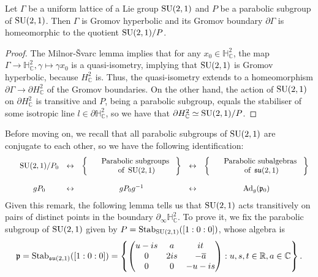 \documentclass{report}
\begin{document}
\begin{lemma}\label{lem:lattice_boundary}
    Let $\Gamma$ be a uniform lattice of a Lie group $\operatorname{{\mathrm{SU}}}(2,1)$ and $P$ be a parabolic subgroup of $\operatorname{{\mathrm{SU}}}(2,1)$.
    Then $\Gamma$ is Gromov hyperbolic and its Gromov boundary $\partial \Gamma$ is homeomorphic to the quotient $\operatorname{{\mathrm{SU}}}(2,1)/P$.  
\end{lemma}
\begin{proof}
    The Milnor-Švarc lemma implies that for any $x_0 \in \mathbb H^2_{\mathbb C}$, the map $\Gamma \to \mathbb H^2_{\mathbb C}, \gamma \mapsto \gamma x_0$ is a quasi-isometry, implying that $\operatorname{{\mathrm{SU}}}(2,1)$ is Gromov hyperbolic, because $H^2_{\mathbb C}$ is.
    Thus, the quasi-isometry extends to a homeomorphism $\partial \Gamma \to \partial H^2_{\mathbb C}$ of the Gromov boundaries.
    On the other hand, the action of $\operatorname{{\mathrm{SU}}}(2,1)$ on $\partial H^2_\mathbb C$ is transitive and $P$, being a parabolic subgroup, equals the stabiliser of some isotropic line $l \in \partial \mathbb H^2_{\mathbb C}$, so we have that $\partial H^2_{\mathbb C} \simeq \operatorname{{\mathrm{SU}}}(2,1)/P$.
\end{proof}
Before moving on, we recall that all parabolic subgroups of $\operatorname{{\mathrm{SU}}}(2,1)$ are conjugate to each other, so we have the following identification:
\[
\begin{array}{cccccc}
    &\operatorname{{\mathrm{SU}}}(2,1)/{P_0} &\leftrightarrow &    \left\{ \begin{array}{cc}
        &\text{ Parabolic subgroups }\\
        &\text{ of } \operatorname{{\mathrm{SU}}}(2,1)
    \end{array} \right\}
 &\leftrightarrow &    \left\{ \begin{array}{cc}
    &\text{ Parabolic subalgebras }\\
    &\text{ of } \operatorname{{\mathfrak{su}}}(2,1)
\end{array} \right\}
\\~\\
    &g P_0 &\leftrightarrow &g P_0 g^{-1} &\leftrightarrow &\operatorname{Ad}_g(\mathfrak p_0)
\end{array}
\]
Given this remark, the following lemma tells us that $\operatorname{{\mathrm{SU}}}(2,1)$ acts transitively on pairs of distinct points in the boundary $\partial_\infty \mathbb H^2_{\mathbb C}$.
To prove it, we fix the parabolic subgroup of $\operatorname{{\mathrm{SU}}}(2,1)$ given by $P = \operatorname{Stab}_{\operatorname{{\mathrm{SU}}}(2,1)}([1:0:0])$,
whose algebra is
\[
\mathfrak p = \operatorname{Stab}_{\operatorname{{\mathfrak{su}}}(2,1)}([1:0:0]) = \left\{
    \begin{pmatrix}
        u - is & a & it\\
        0 & 2is & -\overline{a}\\
        0 & 0 & -u - is
    \end{pmatrix} : u,s,t \in \mathbb R, a \in \mathbb C
\right\}.
\]
\end{document}

